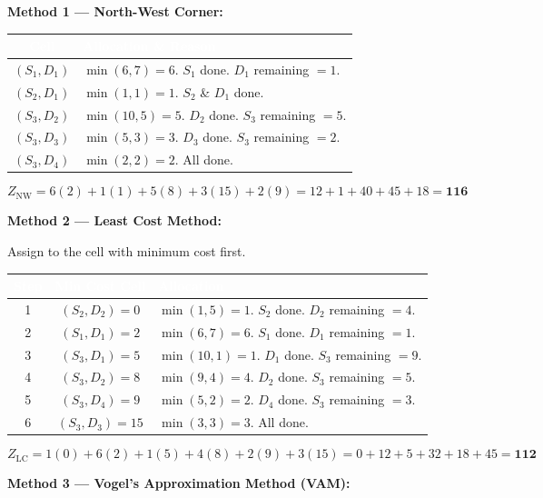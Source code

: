 \documentclass[12pt]{article}
\begin{document}
\begin{ansbox}
\textbf{Method 1 — North-West Corner:}

\begin{center}
\begin{tabular}{|c|l|}
\hline
\rowcolor{primary!80}\textcolor{white}{\textbf{Cell}}&\textcolor{white}{\textbf{Allocation \& Reason}}\\
\hline
$(S_1,D_1)$ & $\min(6,7)=6$. $S_1$ done. $D_1$ remaining $=1$.\\\hline
$(S_2,D_1)$ & $\min(1,1)=1$. $S_2$ \& $D_1$ done.\\\hline
$(S_3,D_2)$ & $\min(10,5)=5$. $D_2$ done. $S_3$ remaining $=5$.\\\hline
$(S_3,D_3)$ & $\min(5,3)=3$. $D_3$ done. $S_3$ remaining $=2$.\\\hline
$(S_3,D_4)$ & $\min(2,2)=2$. All done.\\\hline
\end{tabular}
\end{center}
\[
  Z_{\text{NW}} = 6(2)+1(1)+5(8)+3(15)+2(9) = 12+1+40+45+18 = \mathbf{116}
\]

\medskip
\textbf{Method 2 — Least Cost Method:}

Assign to the cell with minimum cost first.

\begin{center}
\begin{tabular}{|c|c|l|}
\hline
\rowcolor{primary!80}\textcolor{white}{\textbf{Step}}&\textcolor{white}{\textbf{Min Cost Cell}}&\textcolor{white}{\textbf{Allocation}}\\
\hline
1 & $(S_2,D_2)=0$ & $\min(1,5)=1$. $S_2$ done. $D_2$ remaining $=4$.\\\hline
2 & $(S_1,D_1)=2$ & $\min(6,7)=6$. $S_1$ done. $D_1$ remaining $=1$.\\\hline
3 & $(S_3,D_1)=5$ & $\min(10,1)=1$. $D_1$ done. $S_3$ remaining $=9$.\\\hline
4 & $(S_3,D_2)=8$ & $\min(9,4)=4$. $D_2$ done. $S_3$ remaining $=5$.\\\hline
5 & $(S_3,D_4)=9$ & $\min(5,2)=2$. $D_4$ done. $S_3$ remaining $=3$.\\\hline
6 & $(S_3,D_3)=15$ & $\min(3,3)=3$. All done.\\\hline
\end{tabular}
\end{center}
\[
  Z_{\text{LC}} = 1(0)+6(2)+1(5)+4(8)+2(9)+3(15) = 0+12+5+32+18+45 = \mathbf{112}
\]

\medskip
\textbf{Method 3 — Vogel's Approximation Method (VAM):}


\end{ansbox}
\end{document}
